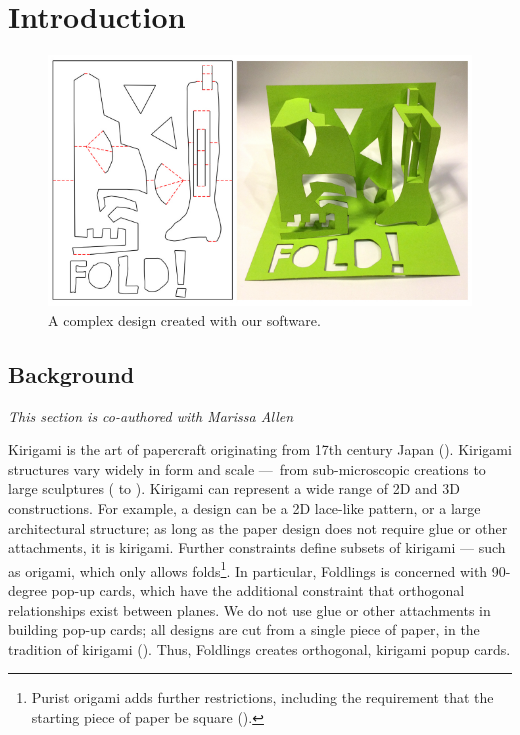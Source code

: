 \chapter{Introduction}

\begin{figure}[htbp]
\centering
\includegraphics{figures/shared/01_Background/complexFoldlings.pdf}
\caption{A complex design created with our software.}
\end{figure}

\section{Background}\label{background}

\emph{This section is co-authored with Marissa Allen}

Kirigami is the art of papercraft originating from 17th century Japan
(\citet{temko1978magic}). Kirigami structures vary widely in form and
scale ---~from sub-microscopic creations to large sculptures
(\citet{grosso2015bending} to \citet{andrewscreating}). Kirigami can
represent a wide range of 2D and 3D constructions. For example, a design
can be a 2D lace-like pattern, or a large architectural structure; as
long as the paper design does not require glue or other attachments, it
is kirigami. Further constraints define subsets of kirigami --- such as
origami, which only allows folds\footnote{Purist origami adds further
  restrictions, including the requirement that the starting piece of
  paper be square (\citet{burczykul}).}. In particular, Foldlings is
concerned with 90-degree pop-up cards, which have the additional
constraint that orthogonal relationships exist between planes. We do not
use glue or other attachments in building pop-up cards; all designs are
cut from a single piece of paper, in the tradition of kirigami
(\citet{temko1978magic}). Thus, Foldlings creates orthogonal, kirigami
popup cards.

